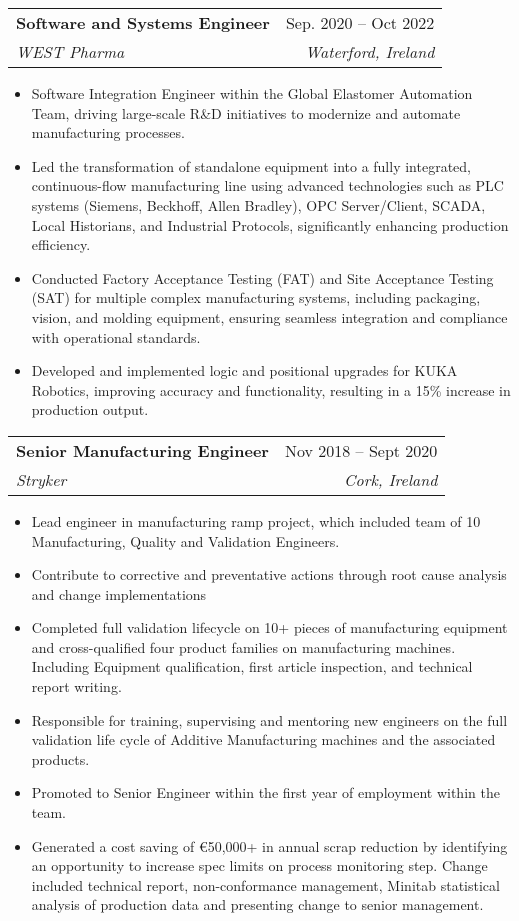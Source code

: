 \documentclass[letterpaper,11pt]{article}
\makeatletter
\newcommand{\resumeItem}[1]{
  \item\small{
    {#1 \vspace{-2pt}}
  }
}
\newcommand{\resumeSubheading}[4]{
  \vspace{-2pt}\item
    \begin{tabular*}{0.97\textwidth}[t]{l@{\extracolsep{\fill}}r}
      \textbf{#1} & #2 \\
      \textit{\small#3} & \textit{\small #4} \\
    \end{tabular*}\vspace{-7pt}
}
\newcommand{\resumeSubSubheading}[2]{
    \item
    \begin{tabular*}{0.97\textwidth}{l@{\extracolsep{\fill}}r}
      \textit{\small#1} & \textit{\small #2} \\
    \end{tabular*}\vspace{-7pt}
}
\newcommand{\resumeSubHeadingListEnd}{\end{itemize}}
\newcommand{\resumeItemListStart}{\begin{itemize}}
\newcommand{\resumeItemListEnd}{\end{itemize}\vspace{-5pt}}
\makeatother
\begin{document}

    \resumeSubheading
      {Software and Systems Engineer}{Sep. 2020 -- Oct 2022}
      {WEST Pharma}{Waterford, Ireland}
      \resumeItemListStart
        \resumeItem{Software Integration Engineer within the Global Elastomer Automation Team, driving large-scale R\&D initiatives to modernize and automate manufacturing processes.}
        \resumeItem{Led the transformation of standalone equipment into a fully integrated, continuous-flow manufacturing line using advanced technologies such as PLC systems (Siemens, Beckhoff, Allen Bradley), OPC Server/Client, SCADA, Local Historians, and Industrial Protocols, significantly enhancing production efficiency.}
        \resumeItem{Conducted Factory Acceptance Testing (FAT) and Site Acceptance Testing (SAT) for multiple complex manufacturing systems, including packaging, vision, and molding equipment, ensuring seamless integration and compliance with operational standards.}
        \resumeItem{Developed and implemented logic and positional upgrades for KUKA Robotics, improving accuracy and functionality, resulting in a 15\% increase in production output.}
    \resumeItemListEnd

    \resumeSubheading
      {Senior Manufacturing Engineer}{Nov 2018 -- Sept 2020}
      {Stryker}{Cork, Ireland}
      \resumeItemListStart
        \resumeItem{Lead engineer in manufacturing ramp project, which included team of 10 Manufacturing, Quality and Validation Engineers.}
        \resumeItem{Contribute to corrective and preventative actions through root cause analysis and change implementations}
        \resumeItem{Completed full validation lifecycle on 10+ pieces of manufacturing equipment and cross-qualified four product families on manufacturing machines. Including Equipment qualification, first article inspection, and technical report writing.}
        \resumeItem{Responsible for training, supervising and mentoring new engineers on the full validation life cycle of Additive Manufacturing machines and the associated products.}
        \resumeItem{Promoted to Senior Engineer within the first year of employment within the team.}
        \resumeItem{Generated a cost saving of €50,000+ in annual scrap reduction by identifying an opportunity to increase spec limits on process monitoring step.
        Change included technical report, non-conformance management, Minitab statistical analysis of production data and presenting change to senior management.}
  \resumeSubHeadingListEnd
\end{document}
